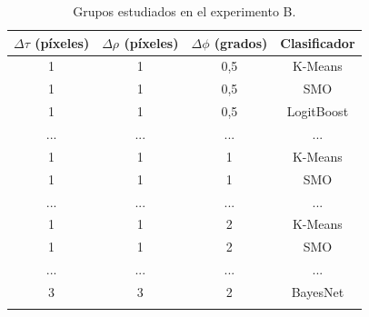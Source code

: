 \begingroup
\renewcommand\arraystretch{0.75}
\begin{longtable}{|c|c|c|c|}
        \hline
        \textbf{$\Delta \tau$ (píxeles)} & \textbf{$\Delta \rho$ (píxeles)} & \textbf{$\Delta \phi$ (grados)} & \textbf{Clasificador} \\  
        \hline
        \endhead
        1 & 1 & 0,5 & K-Means \\ \hline
        1 & 1 & 0,5 & SMO \\ \hline
        1 & 1 & 0,5 & LogitBoost \\ \hline
        ... & ... & ... & ... \\ \hline
        1 & 1 & 1 & K-Means \\ \hline
        1 & 1 & 1 & SMO \\ \hline
        ... & ... & ... & ... \\ \hline
        1 & 1 & 2 & K-Means \\ \hline
        1 & 1 & 2 & SMO \\ \hline
        ... & ... & ... & ... \\ \hline
        3 & 3 & 2 & BayesNet \\ \hline
        
    
    \caption{Grupos estudiados en el experimento B.}
    \label{tab:gruposB}
\end{longtable}
\endgroup


